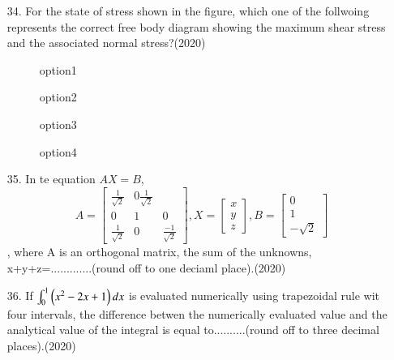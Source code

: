 \documentclass[journal]{IEEEtran}
\begin{document}
\begin{enumerate}
\begin{enumerate}
    \end{enumerate} 
    \item[34.] For the state of stress shown in the figure, which one of the follwoing represents the correct free body diagram showing the maximum shear stress and the associated normal stress?\hfill (2020)
    \begin{figure}[!ht]
        \centering
        \caption{}
    \end{figure}
    \begin{figure}[!ht]
        \centering
        \caption{option1}
    \end{figure}
    \begin{figure}[!ht]
        \centering
        \caption{option2}
    \end{figure}
    \begin{figure}[!ht]
        \centering
        \caption{option3}
    \end{figure}
    \begin{figure}[!ht]
        \centering
        \caption{option4}
    \end{figure}
    
    \item[35.] In te equation $AX = B$, $$A = \begin{bmatrix}\frac{1}{\sqrt{2}}&0 \frac{1}{\sqrt{2}}\\0&1&0\\\frac{1}{\sqrt{2}}&0&\frac{-1}{\sqrt{2}}\end{bmatrix}, X =\begin{bmatrix}x\\y\\z \end{bmatrix}, B=\begin{bmatrix}0\\1\\-\sqrt{2} \end{bmatrix}$$, where A is an orthogonal matrix, the sum of the unknowns, x+y+z=.............(round off to one deciaml place).\hfill (2020)
    \item[36.] If $\int_{0}^{1}\left(x^2-2x+1\right)dx$ is evaluated numerically using trapezoidal rule wit four intervals, the difference betwen the numerically evaluated value and the analytical value of the integral is equal to..........(round off to three decimal places).\hfill (2020)
    

\end{enumerate}
\end{document}
